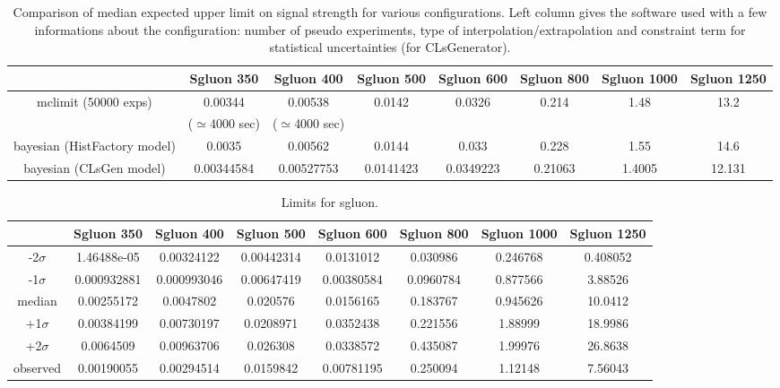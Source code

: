 \documentclass[a4paper,notitlepage]{article}
\begin{document}
  
  \begin{sidewaystable}
    \begin{center}
      \caption{Comparison of median expected upper limit on signal strength for various configurations. Left column gives the software used with a few informations about the configuration: number of pseudo experiments, type of interpolation/extrapolation and constraint term for statistical uncertainties (for CLsGenerator).}
      \begin{tabular}{ | c | c | c | c | c | c | c | c |}
	\hline
	                     & Sgluon 350 & Sgluon 400 & Sgluon 500 & Sgluon 600 & Sgluon 800 & Sgluon 1000 & Sgluon 1250 \\ \hline
	mclimit (50000 exps) & 0.00344    & 0.00538    & 0.0142  & 0.0326  & 0.214   & 1.48      & 13.2      \\
	        & ($\simeq$4000 sec)      & ($\simeq$4000 sec)           &            &            &            &             &             \\ \hline
	
	
	
	
	
	
	bayesian (HistFactory model)           & 0.0035     & 0.00562   &  0.0144 &  0.033  & 0.228    &  1.55      & 14.6                     \\ \hline
	bayesian (CLsGen model)           &   0.00344584   & 0.00527753  & 0.0141423  &  0.0349223  &  0.21063  &  1.4005     &    12.131                  \\
	\hline
      \end{tabular}
    \end{center}
  \end{sidewaystable}
  
\newpage
\begin{table}
    \begin{center}
      \caption{Limits for sgluon.}
      \begin{tabular}{ | c | c | c | c | c | c | c | c |}
	\hline
	                     & Sgluon 350 & Sgluon 400 & Sgluon 500 & Sgluon 600 & Sgluon 800 & Sgluon 1000 & Sgluon 1250 \\ \hline
-2$\sigma$ &1.46488e-05 & 0.00324122 & 0.00442314 & 0.0131012 & 0.030986 & 0.246768 & 0.408052 \\ \hline 
-1$\sigma$ &0.000932881 & 0.000993046 & 0.00647419 & 0.00380584 & 0.0960784 & 0.877566 & 3.88526 \\ \hline 
median &0.00255172 & 0.0047802 & 0.020576 & 0.0156165 & 0.183767 & 0.945626 & 10.0412 \\ \hline 
+1$\sigma$ &0.00384199 & 0.00730197 & 0.0208971 & 0.0352438 & 0.221556 & 1.88999 & 18.9986 \\ \hline 
+2$\sigma$ &0.0064509 & 0.00963706 & 0.026308 & 0.0338572 & 0.435087 & 1.99976 & 26.8638 \\ \hline 
observed &0.00190055 & 0.00294514 & 0.0159842 & 0.00781195 & 0.250094 & 1.12148 & 7.56043 \\ \hline 
      \end{tabular}
    \end{center}
\end{table}
\end{document}

